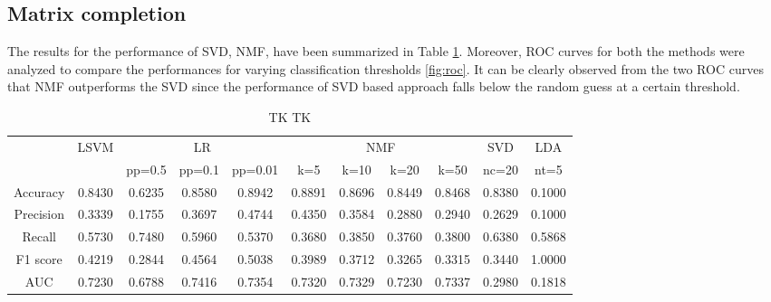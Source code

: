 \documentclass{article} %
\begin{document}
\subsection{Matrix completion}

The results for the performance of SVD, NMF, have been summarized in Table \ref{tab:standardresults}. Moreover, ROC curves for both the methods were analyzed to compare the performances for varying classification thresholds \ref{fig:roc}. It can be clearly observed from the two ROC curves that NMF outperforms the SVD since the performance of SVD based approach falls below the random guess at a certain threshold.

\begin{table}
\centering
{
\fontsize{8 }{14}\selectfont
\noindent\begin{tabular}{ c | c | c c c | c c c c | c | c }
	\hline
	    & \multirow{2}{*}{LSVM}
	    & \multicolumn{3}{c|}{LR}
	    & \multicolumn{4}{c|}{NMF}
	    & \multicolumn{1}{c|}{SVD}
	    & \multicolumn{1}{c}{LDA}\\
	\cline{3-11}
    & & pp=0.5 & pp=0.1 & pp=0.01 & k=5 & k=10 & k=20 & k=50 & nc=20 & nt=5 \\
	\hline
	\hline
	Accuracy  & 0.8430 & 0.6235 & 0.8580 & 0.8942 & 0.8891 & 0.8696 & 0.8449 & 0.8468 & 0.8380 & 0.1000 \\
	\hline
	Precision & 0.3339 & 0.1755 & 0.3697 & 0.4744 & 0.4350 & 0.3584 & 0.2880 & 0.2940 & 0.2629 & 0.1000 \\
	\hline
	Recall    & 0.5730 & 0.7480 & 0.5960 & 0.5370 & 0.3680 & 0.3850 & 0.3760 & 0.3800 & 0.6380 & 0.5868 \\
	\hline
	F1 score  & 0.4219 & 0.2844 & 0.4564 & 0.5038 & 0.3989 & 0.3712 & 0.3265 & 0.3315 & 0.3440 & 1.0000 \\
	\hline
	AUC       & 0.7230 & 0.6788 & 0.7416 & 0.7354 & 0.7320 & 0.7329 & 0.7230 & 0.7337 & 0.2980 & 0.1818 \\
	\hline
\end{tabular}
}
\caption{\small TK TK}
\label{tab:standardresults}
\end{table}
\end{document}
